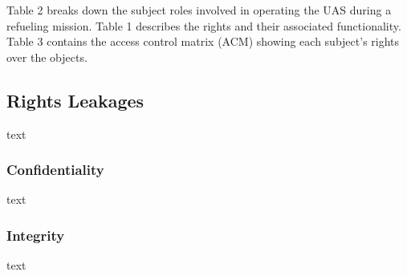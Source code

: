 \documentclass[10pt,journal,compsoc]{IEEEtran}
\begin{document}
Table 2 breaks down the subject roles involved in operating the UAS during a refueling mission. Table 1 describes the rights and their associated functionality. Table 3 contains the access control matrix (ACM) showing each subject's rights over the objects.

\subsection{Rights Leakages}

text

\subsubsection{Confidentiality}

text

\subsubsection{Integrity}

text




\end{document}
